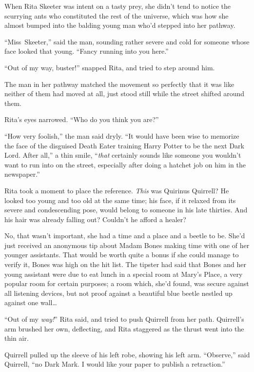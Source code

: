 When Rita Skeeter was intent on a tasty prey, she didn’t tend to notice the scurrying ants who constituted the rest of the universe, which was how she almost bumped into the balding young man who’d stepped into her pathway.

“Miss~Skeeter,” said the man, sounding rather severe and cold for someone whose face looked that young. “Fancy running into you here.”

“Out of my way, buster!” snapped Rita, and tried to step around him.

The man in her pathway matched the movement so perfectly that it was like neither of them had moved at all, just stood still while the street shifted around them.

Rita’s eyes narrowed. “Who do you think you are?”

“How very foolish,” the man said dryly. “It would have been wise to memorize the face of the disguised Death Eater training Harry Potter to be the next Dark Lord. After all,” a thin smile, “\emph{that} certainly sounds like someone you wouldn’t want to run into on the street, especially after doing a hatchet job on him in the newspaper.”

Rita took a moment to place the reference. \emph{This} was Quirinus Quirrell? He looked too young and too old at the same time; his face, if it relaxed from its severe and condescending pose, would belong to someone in his late thirties. And his hair was already falling out? Couldn’t he afford a healer?

No, that wasn’t important, she had a time and a place and a beetle to be. She’d just received an anonymous tip about Madam Bones making time with one of her younger assistants. That would be worth quite a bonus if she could manage to verify it, Bones was high on the hit list. The tipster had said that Bones and her young assistant were due to eat lunch in a special room at Mary’s Place, a very popular room for certain purposes; a room which, she’d found, was secure against all listening devices, but not proof against a beautiful blue beetle nestled up against one wall…

“Out of my \emph{way!}” Rita said, and tried to push Quirrell from her path. Quirrell’s arm brushed her own, deflecting, and Rita staggered as the thrust went into the thin air.

Quirrell pulled up the sleeve of his left robe, showing his left arm. “Observe,” said Quirrell, “no Dark Mark. I would like your paper to publish a retraction.”

